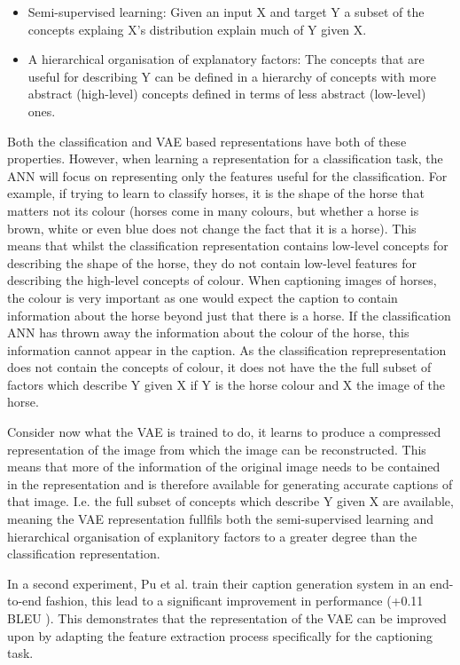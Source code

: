 \begin{itemize}
	\item Semi-supervised learning: Given an input X and target Y a subset of the concepts explaing X's distribution explain much of Y given X.
	\item A hierarchical organisation of explanatory factors: The concepts that are useful for describing Y can be defined in a hierarchy of concepts with more abstract (high-level) concepts defined in terms of less abstract (low-level) ones.
\end{itemize}

Both the classification and \ac{VAE} based representations have both of these properties. However, when learning a representation for a classification task, the \ac{ANN} will focus on representing only the features useful for the classification. For example, if trying to learn to classify horses, it is the shape of the horse that matters not its colour (horses come in many colours, but whether a horse is brown, white or even blue does not change the fact that it is a horse). This means that whilst the classification representation contains low-level concepts for describing the shape of the horse, they do not contain low-level features for describing the high-level concepts of colour.
When captioning images of horses, the colour is very important as one would expect the caption to contain information about the horse beyond just that there is a horse. If the classification \ac{ANN} has thrown away the information about the colour of the horse, this information cannot appear in the caption. As the classification reprepresentation does not contain the concepts of colour, it does not have the the full subset of factors which describe Y given X if Y is the horse colour and X the image of the horse.

Consider now what the \ac{VAE} is trained to do, it learns to produce a compressed representation of the image from which the image can be reconstructed. This means that more of the information of the original image needs to be contained in the representation and is therefore available for generating accurate captions of that image. I.e. the full subset of concepts which describe Y given X are available, meaning the \ac{VAE} representation fullfils both the semi-supervised learning and hierarchical organisation of explanitory factors to a greater degree than the classification representation.

In a second experiment, Pu et al. train their caption generation system in an end-to-end fashion, this lead to a significant improvement in performance (+0.11 BLEU \cite{bleu}). This demonstrates that the representation of the \ac{VAE} can be improved upon by adapting the feature extraction process specifically for the captioning task.


